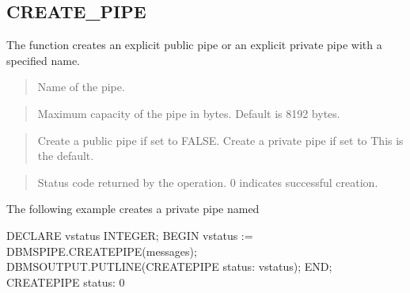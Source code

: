 \documentclass[letterpaper,10pt,english,openany,oneside]{sphinxmanual}
\begin{document}
\newpage


\subsection{CREATE\_PIPE}
\label{\detokenize{create_pipe::doc}}\label{\detokenize{create_pipe:create-pipe}}
The  function creates an explicit public pipe or an explicit
private pipe with a specified name.
\begin{quote}

\begin{quote}

\end{quote}
\end{quote}


\begin{quote}

Name of the pipe.
\end{quote}

\begin{quote}

Maximum capacity of the pipe in bytes. Default is 8192 bytes.
\end{quote}

\begin{quote}

Create a public pipe if set to FALSE. Create a private pipe if set to
 This is the default.
\end{quote}

\begin{quote}

Status code returned by the operation. 0 indicates successful creation.
\end{quote}


The following example creates a private pipe named 

%
\begin{sphinxVerbatim}[commandchars=\\\{\}]
DECLARE
    v\PYGZus{}status        INTEGER;
BEGIN
    v\PYGZus{}status := DBMS\PYGZus{}PIPE.CREATE\PYGZus{}PIPE(\PYGZsq{}messages\PYGZsq{});
    DBMS\PYGZus{}OUTPUT.PUT\PYGZus{}LINE(\PYGZsq{}CREATE\PYGZus{}PIPE status: \PYGZsq{} \textbar{}\textbar{} v\PYGZus{}status);
END;
CREATE\PYGZus{}PIPE status: 0
\end{sphinxVerbatim}
\end{document}
